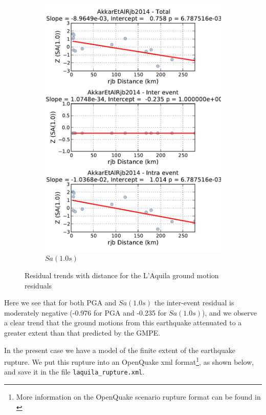 \begin{figure}[htb]
\begin{subfigure}[b]{0.49\textwidth}
      \includegraphics[width=\textwidth]{./figures/hazard/LAquila_Residuals_with_distance_sa1.pdf}
      \caption{$Sa \left( {1.0 s} \right)$ }
      \label{fig:laquila_resid_sa1}
  \end{subfigure}
  \caption{Residual trends with distance for the L'Aquila ground motion residuals}
  \label{fig:laquila_resid_distance}
\end{figure}

Here we see that for both PGA and $Sa \left( {1.0 s} \right)$ the inter-event residual is moderately negative (-0.976 for PGA and -0.235 for $Sa \left( {1.0 s} \right)$), and we observe a clear trend that the ground motions from this earthquake attenuated to a greater extent than that predicted by the GMPE. 

In the present case we have a model of the finite extent of the earthquake rupture. We put this rupture into an OpenQuake xml format\footnote{More information on the OpenQuake scenario rupture format can be found in \textcite{crowley2013}}, as shown below, and save it in the file \verb=laquila_rupture.xml=.

